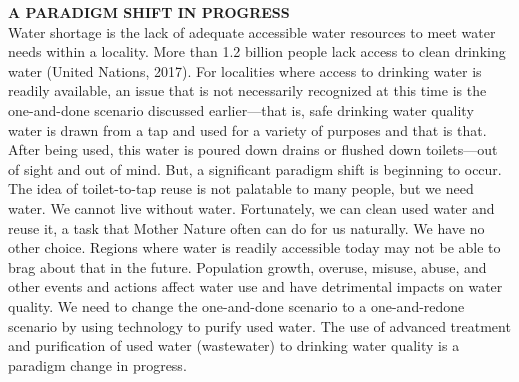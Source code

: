 \textbf{A PARADIGM SHIFT IN PROGRESS}\\
Water shortage is the lack of adequate accessible water resources to meet water needs within a locality. More than 1.2 billion people lack access to clean drinking water (United Nations, 2017). For localities where access to drinking water is readily available, an issue that is not necessarily recognized at this time is the one-and-done scenario discussed earlier—that is, safe drinking water quality water is drawn from a tap and used for a variety of purposes and that is that. After being used, this water is poured down drains or flushed down toilets—out of sight and out of mind. But, a significant paradigm shift is beginning to occur. The idea of toilet-to-tap reuse is not palatable to many people, but we need water. We cannot live without water. Fortunately, we can clean used water and reuse it, a task that Mother Nature often can do for us naturally. We have no other choice. Regions where water is readily accessible today may not be able to brag about that in the future. Population growth, overuse, misuse, abuse, and other events and actions affect water use and have detrimental impacts on water quality. We need to change the one-and-done scenario to a one-and-redone scenario by using technology to purify used water. The use of advanced treatment and purification of used water (wastewater) to drinking water quality is a paradigm change in progress.\\


